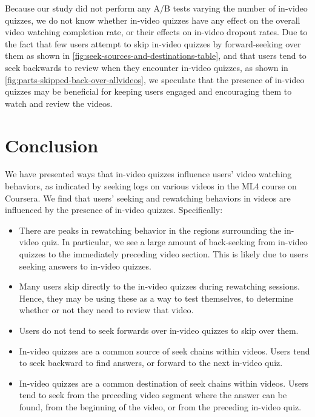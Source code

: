 \documentclass{sigchi}
\begin{document}
Because our study did not perform any A/B tests varying the number of in-video quizzes, we do not know whether in-video quizzes have any effect on the overall video watching completion rate, or their effects on in-video dropout rates. Due to the fact that few users attempt to skip in-video quizzes by forward-seeking over them as shown in \autoref{fig:seek-sources-and-destinations-table}, and that users tend to seek backwards to review when they encounter in-video quizzes, as shown in \autoref{fig:parts-skipped-back-over-allvideos}, we speculate that the presence of in-video quizzes may be beneficial for keeping users engaged and encouraging them to watch and review the videos.

\section{Conclusion}

We have presented ways that in-video quizzes influence users' video watching behaviors, as indicated by seeking logs on various videos in the ML4 course on Coursera. We find that users' seeking and rewatching behaviors in videos are influenced by the presence of in-video quizzes. Specifically:

\begin{itemize}
\item There are peaks in rewatching behavior in the regions surrounding the in-video quiz. In particular, we see a large amount of back-seeking from in-video quizzes to the immediately preceding video section. This is likely due to users seeking answers to in-video quizzes.
\item Many users skip directly to the in-video quizzes during rewatching sessions. Hence, they may be using these as a way to test themselves, to determine whether or not they need to review that video. 
\item Users do not tend to seek forwards over in-video quizzes to skip over them.
\item In-video quizzes are a common source of seek chains within videos. Users tend to seek backward to find answers, or forward to the next in-video quiz.
\item In-video quizzes are a common destination of seek chains within videos. Users tend to seek from the preceding video segment where the answer can be found, from the beginning of the video, or from the preceding in-video quiz.
\end{itemize}




\balance{}



\end{document}
